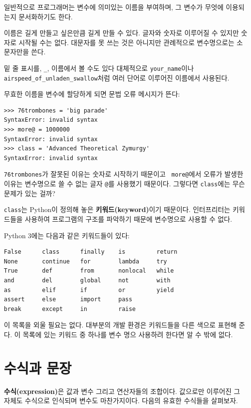 \documentclass[10pt]{book}
\begin{document}
일반적으로 프로그래머는 변수에 의미있는 이름을 부여하며, 그 변수가
무엇에 이용되는지 문서화하기도 한다.

이름은 길게 만들고 싶은만큼 길게 만들 수 있다.  글자와 숫자로 이루어질
수 있지만 숫자로 시작될 수는 없다. 대문자를 못 쓰는 것은 아니지만
관례적으로 변수명으로는 소문자만을 쓴다.

밑 줄 표시를, \verb"_", 이름에서 볼 수도 있다 대체적으로
\verb"your_name"이나 \verb"airspeed_of_unladen_swallow"처럼 여러 단어로
이루어진 이름에서 사용된다.

무효한 이름을 변수에 할당하게 되면 문법 오류 메시지가 뜬다:

\begin{verbatim}
>>> 76trombones = 'big parade'
SyntaxError: invalid syntax
>>> more@ = 1000000
SyntaxError: invalid syntax
>>> class = 'Advanced Theoretical Zymurgy'
SyntaxError: invalid syntax
\end{verbatim}
%
{\tt 76trombones}가 잘못된 이유는 숫자로 시작하기 때문이고 {\tt
  more@}에서 오류가 발생한 이유는 변수명으로 쓸 수 없는 글자 {\tt @}를
사용했기 때문이다.  그렇다면 {\tt class}에는 무슨 문제가 있는 걸까?

{\tt class}는 Python이 정의해 놓은 {\bf 키워드(keyword)}이기 때문이다.
인터프리터는 키워드들을 사용하여 프로그램의 구조를 파악하기 때문에
변수명으로 사용할 수 없다.  

Python 3에는 다음과 같은 키워드들이 있다:

\begin{verbatim}
False      class      finally    is         return
None       continue   for        lambda     try
True       def        from       nonlocal   while
and        del        global     not        with
as         elif       if         or         yield
assert     else       import     pass
break      except     in         raise
\end{verbatim}
%
이 목록을 외울 필요는 없다.  대부분의 개발 환경은 키워드들을 다른
색으로 표현해 준다.  이 목록에 있는 키워드 중 하나를 변수 명으
사용하려 한다면 알 수 밖에 없다.


\section{수식과 문장}

{\bf 수식(expression)}은 값과 변수 그리고 연산자들의
조합이다. 값으로만 이루어진 그 자체도 수식으로 인식되며 변수도
마찬가지이다. 다음의 유효한 수식들을 살펴보자.
\end{document}
